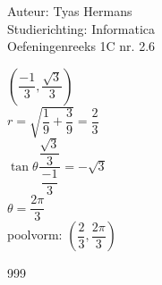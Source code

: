 \documentclass[a4paper]{article}
\begin{document}
  
\noindent \large Auteur: Tyas Hermans \\
\noindent \large Studierichting: Informatica\\
\noindent \large Oefeningenreeks 1C nr. 2.6 \\

\medskip

\normalsize

$\left( \dfrac{-1}{3}, \dfrac{\sqrt{3}}{3} \right)$\\

$r = \sqrt{ \dfrac{1}{9}+ \dfrac{3}{9}} = \dfrac{2}{3}$\\

$\tan{\theta} \dfrac{\dfrac{\sqrt{3}}{3}}{\dfrac{-1}{3}} = - \sqrt{3}$\\

$\theta = \dfrac{2\pi}{3}$\\

poolvorm: $\left( \dfrac{2}{3}, \dfrac{2\pi}{3} \right)$\\



\begin{thebibliography}{999}
\end{thebibliography}
\end{document}
